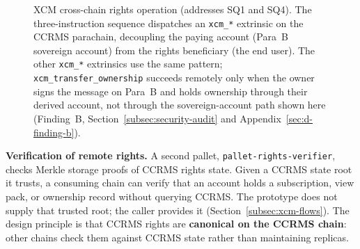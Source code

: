 \begin{figure}[htbp]
\vspace{\baselineskip}
\centering
{}
\caption{XCM cross-chain rights operation (addresses SQ1 and SQ4). The three-instruction sequence dispatches an \texttt{xcm\_*} extrinsic on the CCRMS parachain, decoupling the paying account (Para~B sovereign account) from the rights beneficiary (the end user). The other \texttt{xcm\_*} extrinsics use the same pattern; \texttt{xcm\_transfer\_ownership} succeeds remotely only when the owner signs the message on Para~B and holds ownership through their derived account, not through the sovereign-account path shown here (Finding~B, Section~\ref{subsec:security-audit} and Appendix~\ref{sec:d-finding-b}).}
\label{fig:xcm-flow}
\end{figure}

\textbf{Verification of remote rights.} A second pallet, \texttt{pallet-rights-verifier}, checks Merkle storage proofs of CCRMS rights state. Given a CCRMS state root it trusts, a consuming chain can verify that an account holds a subscription, view pack, or ownership record without querying CCRMS. The prototype does not supply that trusted root; the caller provides it (Section~\ref{subsec:xcm-flows}). The design principle is that CCRMS rights are \textbf{canonical on the CCRMS chain}: other chains check them against CCRMS state rather than maintaining replicas.

